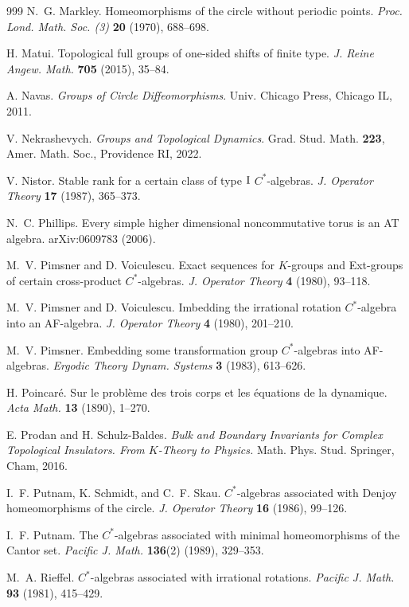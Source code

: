 \documentclass[11pt,a4paper,leqno]{amsart}
\theoremstyle{definition}
\theoremstyle{remark}
\numberwithin{equation}{section}
\theoremstyle{plain}
\begin{document}
\begin{thebibliography}{999}
N.~G. Markley.
Homeomorphisms of the circle without periodic points. 
{\it Proc. Lond. Math. Soc. (3)} {\bf 20} (1970), 688--698.

H. Matui.
Topological full groups of one-sided shifts of finite type.
{\it J. Reine Angew. Math.} {\bf 705} (2015), 35--84.

A. Navas.
{\it Groups of Circle Diffeomorphisms}.
Univ. Chicago Press, Chicago IL, 2011.

V. Nekrashevych.
{\it Groups and Topological Dynamics}.
Grad. Stud. Math. {\bf 223}, Amer. Math. Soc.,
Providence RI, 2022.

V. Nistor.
Stable rank for a certain class of type ${\rm I}$ $C^*$-algebras.
{\it J. Operator Theory} {\bf 17} (1987), 365--373.

N.~C. Phillips.
Every simple higher dimensional noncommutative torus is an AT algebra.
arXiv:0609783 (2006).

M.~V. Pimsner and D. Voiculescu.
Exact sequences for $K$-groups and Ext-groups of certain cross-product $C^*$-algebras.
{\it J. Operator Theory} {\bf 4} (1980), 93--118.

M.~V. Pimsner and D. Voiculescu.
Imbedding the irrational rotation $C^*$-algebra into an AF-algebra.
{\it J. Operator Theory} {\bf 4} (1980), 201--210. 

M.~V. Pimsner.
Embedding some transformation group $C^*$-algebras into AF-algebras.
{\it Ergodic Theory Dynam. Systems} {\bf 3} (1983), 613--626.

H. Poincaré.
Sur le problème des trois corps et les équations de la dynamique.
{\it Acta Math.} {\bf 13} (1890), 1--270.

E. Prodan and H. Schulz-Baldes.
{\it Bulk and Boundary Invariants for Complex Topological Insulators. From $K$-Theory to Physics.}
Math. Phys. Stud. Springer, Cham, 2016.

I.~F. Putnam, K. Schmidt, and C.~F. Skau.
$C^*$-algebras associated with Denjoy homeomorphisms of the circle.
{\it J. Operator Theory} {\bf 16} (1986), 99--126.

I.~F. Putnam.
The $C^*$-algebras associated with minimal homeomorphisms of the Cantor set.
{\it Pacific J. Math.} {\bf 136}(2) (1989), 329--353.

M.~A. Rieffel.
$C^*$-algebras associated with irrational rotations.
{\it Pacific J. Math.} {\bf 93} (1981), 415--429.


\end{thebibliography}
\end{document}
